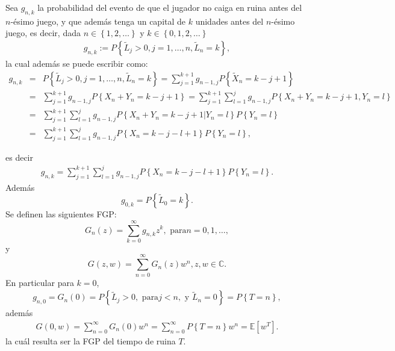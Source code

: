 \documentclass{article}
\newcommand{\esp}{\mathbb{E}}
\numberwithin{equation}{section}
\begin{document}
Sea $g_{n,k}$ la probabilidad del evento de que el jugador no caiga en ruina antes del $n$-\'esimo juego, y que adem\'as tenga un capital de $k$ unidades antes del $n$-\'esimo juego, es decir, dada $n\in\left\{1,2,\ldots\right\}$ y $k\in\left\{0,1,2,\ldots\right\}$
\begin{eqnarray}
g_{n,k}:=P\left\{\tilde{L}_{j}>0, j=1,\ldots,n,
\tilde{L}_{n}=k\right\},
\end{eqnarray}
la cual adem\'as se puede escribir como:
\begin{eqnarray*}
g_{n,k}&=&P\left\{\tilde{L}_{j}>0, j=1,\ldots,n,
\tilde{L}_{n}=k\right\}=\sum_{j=1}^{k+1}g_{n-1,j}P\left\{\tilde{X}_{n}=k-j+1\right\}\\
&=&\sum_{j=1}^{k+1}g_{n-1,j}P\left\{X_{n}+Y_{n}=k-j+1\right\}=\sum_{j=1}^{k+1}\sum_{l=1}^{j}g_{n-1,j}P\left\{X_{n}+Y_{n}=k-j+1,Y_{n}=l\right\}\\
&=&\sum_{j=1}^{k+1}\sum_{l=1}^{j}g_{n-1,j}P\left\{X_{n}+Y_{n}=k-j+1|Y_{n}=l\right\}P\left\{Y_{n}=l\right\}\\
&=&\sum_{j=1}^{k+1}\sum_{l=1}^{j}g_{n-1,j}P\left\{X_{n}=k-j-l+1\right\}P\left\{Y_{n}=l\right\},
\end{eqnarray*}

es decir
\begin{eqnarray}\label{Eq.Gnk.2S}
g_{n,k}=\sum_{j=1}^{k+1}\sum_{l=1}^{j}g_{n-1,j}P\left\{X_{n}=k-j-l+1\right\}P\left\{Y_{n}=l\right\}.
\end{eqnarray}
Adem\'as
\begin{equation}\label{Eq.L02S}
g_{0,k}=P\left\{\tilde{L}_{0}=k\right\}.
\end{equation}
Se definen las siguientes FGP:
\begin{equation}\label{Eq.3.16.a.2S}
G_{n}\left(z\right)=\sum_{k=0}^{\infty}g_{n,k}z^{k},\textrm{ para
}n=0,1,\ldots,
\end{equation}
y 
\begin{equation}\label{Eq.3.16.b.2S}
G\left(z,w\right)=\sum_{n=0}^{\infty}G_{n}\left(z\right)w^{n}, z,w\in\mathbb{C}.
\end{equation}
En particular para $k=0$,
\begin{eqnarray*}
g_{n,0}=G_{n}\left(0\right)=P\left\{\tilde{L}_{j}>0,\textrm{ para
}j<n,\textrm{ y }\tilde{L}_{n}=0\right\}=P\left\{T=n\right\},
\end{eqnarray*}
adem\'as
\begin{eqnarray*}%
G\left(0,w\right)=\sum_{n=0}^{\infty}G_{n}\left(0\right)w^{n}=\sum_{n=0}^{\infty}P\left\{T=n\right\}w^{n}
=\esp\left[w^{T}\right].
\end{eqnarray*}
la cu\'al resulta ser la FGP del tiempo de ruina $T$.
\end{document}
